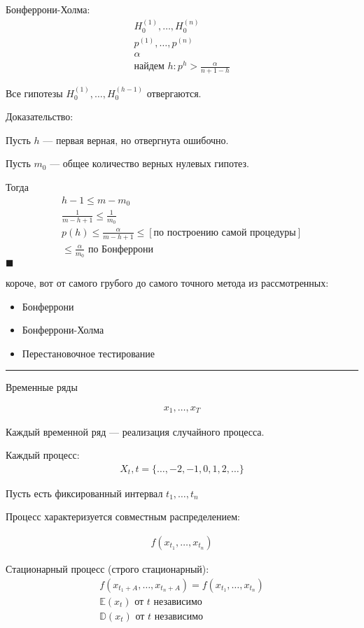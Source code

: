 \documentclass{book}
\begin{document}
Бонферрони-Холма:
\begin{gather*}
  H_0^{(1)},\dots,H_0^{(n)}\\
  p^{(1)},\dots,p^{(n)}\\
  \alpha\\
  \textrm{найдем }h: p^h > \frac{\alpha}{n+1-h}
\end{gather*}

Все гипотезы $H_0^{(1)},\dots,H_0^{(h-1)}$ отвергаются.

Доказательство:

Пусть $h$ --- первая верная, но отвергнута ошибочно.

Пусть $m_0$ --- общее количество верных нулевых гипотез.

Тогда
\begin{gather*}
  h-1\leq m-m_0\\
  \frac{1}{m-h+1}\leq\frac{1}{m_0}\\
  p(h)\leq \frac{\alpha}{m-h+1} \leq [\textrm{по построению самой процедуры}]\\
  \leq \frac{\alpha}{m_0}\textrm{ по Бонферрони}
\end{gather*}
$\blacksquare$

короче, вот от самого грубого до самого точного метода из рассмотренных:
\begin{itemize}
    \item Бонферрони
    \item Бонферрони-Холма
    \item Перестановочное тестирование
\end{itemize}

\hrule

Временные ряды

\begin{gather*}
  x_1,\dots,x_T
\end{gather*}

Каждый временной ряд --- реализация случайного процесса.

Каждый процесс:
\begin{gather*}
  X_t, t=\{\dots,-2,-1,0,1,2,\dots\}
\end{gather*}

Пусть есть фиксированный интервал $t_1,\dots,t_n$

Процесс характеризуется совместным распределением:

\begin{gather*}
  f(x_{t_1},\dots,x_{t_n})
\end{gather*}

Стационарный процесс (строго стационарный):
\begin{gather*}
  f(x_{t_1+A},\dots,x_{t_n+A})= f(x_{t_1},\dots,x_{t_n})\\
  \mathbb{E}(x_t)\textrm{ от $t$ независимо}\\
  \mathbb{D}(x_t)\textrm{ от $t$ независимо}
\end{gather*}
\end{document}

